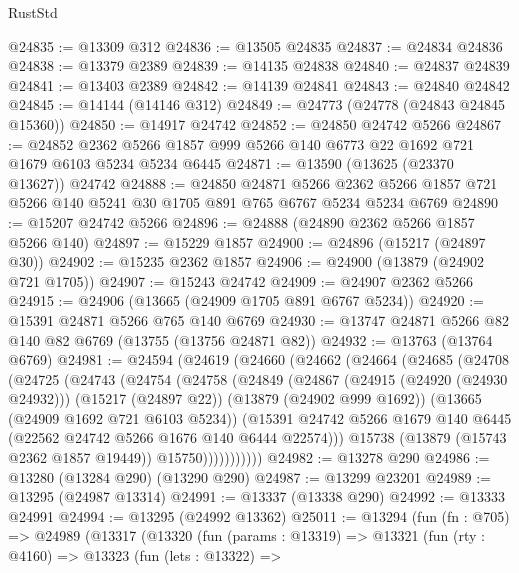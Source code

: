 \begin{lexlean}{RustStd}
\begin{coremodule}
@24835 := @13309 @312
@24836 := @13505 @24835
@24837 := @24834 @24836
@24838 := @13379 @2389
@24839 := @14135 @24838
@24840 := @24837 @24839
@24841 := @13403 @2389
@24842 := @14139 @24841
@24843 := @24840 @24842
@24845 := @14144 (@14146 @312)
@24849 := @24773 (@24778 (@24843 @24845 @15360))
@24850 := @14917 @24742
@24852 := @24850 @24742 @5266
@24867 := @24852
    @2362
    @5266
    @1857
    @999
    @5266
    @140
    @6773
    @22
    @1692
    @721
    @1679
    @6103
    @5234
    @5234
    @6445
@24871 := @13590 (@13625 (@23370 @13627)) @24742
@24888 := @24850
    @24871
    @5266
    @2362
    @5266
    @1857
    @721
    @5266
    @140
    @5241
    @30
    @1705
    @891
    @765
    @6767
    @5234
    @5234
    @6769
@24890 := @15207 @24742 @5266
@24896 := @24888 (@24890 @2362 @5266 @1857 @5266 @140)
@24897 := @15229 @1857
@24900 := @24896 (@15217 (@24897 @30))
@24902 := @15235 @2362 @1857
@24906 := @24900 (@13879 (@24902 @721 @1705))
@24907 := @15243 @24742
@24909 := @24907 @2362 @5266
@24915 := @24906 (@13665 (@24909 @1705 @891 @6767 @5234))
@24920 := @15391 @24871 @5266 @765 @140 @6769
@24930 := @13747 @24871 @5266 @82 @140 @82 @6769 (@13755 (@13756 @24871 @82))
@24932 := @13763 (@13764 @6769)
@24981 := @24594
    (@24619
      (@24660
        (@24662
          (@24664
            (@24685
              (@24708
                (@24725
                  (@24743
                    (@24754
                      (@24758
                        (@24849
                          (@24867
                            (@24915 (@24920 (@24930 @24932)))
                            (@15217 (@24897 @22))
                            (@13879 (@24902 @999 @1692))
                            (@13665 (@24909 @1692 @721 @6103 @5234))
                            (@15391
                              @24742
                              @5266
                              @1679
                              @140
                              @6445
                              (@22562 @24742 @5266 @1676 @140 @6444 @22574)))
                          @15738
                          (@13879 (@15743 @2362 @1857 @19449))
                          @15750)))))))))))
@24982 := @13278 @290
@24986 := @13280 (@13284 @290) (@13290 @290)
@24987 := @13299 @23201
@24989 := @13295 (@24987 @13314)
@24991 := @13337 (@13338 @290)
@24992 := @13333 @24991
@24994 := @13295 (@24992 @13362)
@25011 := @13294
    (fun (fn : @705) =>
    @24989
      (@13317
        (@13320
          (fun (params : @13319) =>
          @13321
            (fun (rty : @4160) =>
            @13323
              (fun (lets : @13322) =>

\end{coremodule}
\end{lexlean}

